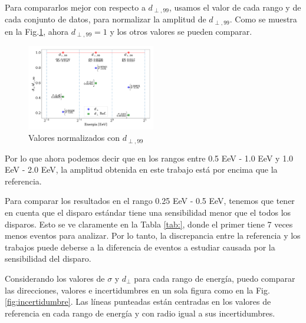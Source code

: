     Para compararlos mejor con respecto a $d_{\perp,99}$, usamos el valor de cada rango y de cada conjunto de datos, para normalizar la amplitud de $d_{\perp,99}$. Como se muestra en la Fig.\ref{fig:normalizado}, ahora $d_{\perp,99}=1$ y los otros valores se pueden comparar. 

    \begin{figure}[H]
        \begin{small}
            \begin{center}
                \includegraphics[width=0.5\textwidth]{d_perp_normalizado.pdf}
            \end{center}
            \caption{Valores normalizados con $d_{\perp,99}$}
            \label{fig:normalizado}
        \end{small}
    \end{figure}

Por lo que ahora podemos decir que en los rangos entre 0.5 EeV - 1.0 EeV y 1.0 EeV - 2.0 EeV, la amplitud obtenida en este trabajo está por encima que la referencia. 

Para comparar los resultados en el  rango 0.25 EeV - 0.5 EeV, tenemos que tener en cuenta que el disparo estándar tiene una sensibilidad menor que el todos los disparos. Esto se ve claramente en la Tabla \ref{tab:}, donde el primer tiene 7 veces menos eventos para analizar. Por lo tanto, la discrepancia entre la referencia y los trabajos puede deberse a la  diferencia de eventos a estudiar causada por la sensibilidad del disparo.




Considerando los valores de $\sigma$ y $d_\perp$ para cada rango de energía, puedo comparar las direcciones, valores e incertidumbres en un sola figura como en la Fig.\ref{fig:incertidumbre}. Las líneas punteadas están centradas en los valores de referencia en cada rango de energía y con radio igual a sus incertidumbres. 

